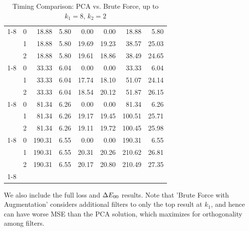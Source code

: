 \begin{table}[htbp]
\begin{tabular}{llrrrrrr}
    \cline{1-8}
    \multirow[t]{3}{*}{5} & 0 & 18.88 & 5.80 & 0.00 & 0.00 & 18.88 & 5.80 \\
    & 1 & 18.88 & 5.80 & 19.69 & 19.23 & 38.57 & 25.03 \\
    & 2 & 18.88 & 5.80 & 19.61 & 18.86 & 38.49 & 24.65 \\
    \cline{1-8}
    \multirow[t]{3}{*}{6} & 0 & 33.33 & 6.04 & 0.00 & 0.00 & 33.33 & 6.04 \\
    & 1 & 33.33 & 6.04 & 17.74 & 18.10 & 51.07 & 24.14 \\
    & 2 & 33.33 & 6.04 & 18.54 & 20.12 & 51.87 & 26.15 \\
    \cline{1-8}
    \multirow[t]{3}{*}{7} & 0 & 81.34 & 6.26 & 0.00 & 0.00 & 81.34 & 6.26 \\
    & 1 & 81.34 & 6.26 & 19.17 & 19.45 & 100.51 & 25.71 \\
    & 2 & 81.34 & 6.26 & 19.11 & 19.72 & 100.45 & 25.98 \\
    \cline{1-8}
    \multirow[t]{3}{*}{8} & 0 & 190.31 & 6.55 & 0.00 & 0.00 & 190.31 & 6.55 \\
    & 1 & 190.31 & 6.55 & 20.31 & 20.26 & 210.62 & 26.81 \\
    & 2 & 190.31 & 6.55 & 20.17 & 20.80 & 210.49 & 27.35 \\
    \cline{1-8}
    \bottomrule
    \end{tabular}
    \caption{Timing Comparison: PCA vs. Brute Force, up to $k_1=8$, $k_2=2$}
    \label{tab:timing_comparison}

\end{table}
\newpage
We also include the full loss and $\Delta E_{00}$ results. 
Note that 'Brute Force with Augmentation' considers additional filters to only the top result at $k_1$, and hence can have worse MSE than the PCA solution, which maximizes for orthogonality among filters. 


